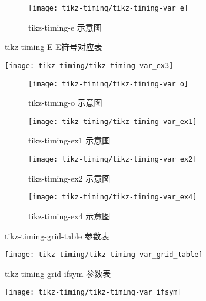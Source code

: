 \begin{figure}[]
  \centering
  \texttt{[image: tikz-timing/tikz-timing-var\_e]}\\
  \caption{tikz-timing-e 示意图}\label{tikz-timing-var_anchor}
\end{figure}
\begin{table}[H]
  \centering
  \caption{tikz-timing-E E符号对应表}\label{tikz-timing-var_ex3}
  \texttt{[image: tikz-timing/tikz-timing-var\_ex3]}\\
\end{table}
\begin{figure}[H]
  \centering
  \texttt{[image: tikz-timing/tikz-timing-var\_o]}\\
  \caption{tikz-timing-o 示意图}\label{tikz-timing-var_o}
\end{figure}

\begin{figure}[H]
  \centering
  \texttt{[image: tikz-timing/tikz-timing-var\_ex1]}\\
  \caption{tikz-timing-ex1 示意图}\label{tikz-timing-var_ex1}
\end{figure}
\begin{figure}[H]
  \centering
  \texttt{[image: tikz-timing/tikz-timing-var\_ex2]}\\
  \caption{tikz-timing-ex2 示意图}\label{tikz-timing-var_ex2}
\end{figure}
\begin{figure}[H]
  \centering
  \texttt{[image: tikz-timing/tikz-timing-var\_ex4]}\\
  \caption{tikz-timing-ex4 示意图}\label{tikz-timing-var_ex4}
\end{figure}

\begin{table}[H]
  \centering
    \caption{tikz-timing-grid-table 参数表}\label{tikz-timing-var_grid_table}
  \texttt{[image: tikz-timing/tikz-timing-var\_grid\_table]}\\
\end{table}

\begin{table}[H]
  \centering
    \caption{tikz-timing-grid-ifsym 参数表}\label{tikz-timing-var_grid_ifsym}
  \texttt{[image: tikz-timing/tikz-timing-var\_ifsym]}\\
\end{table}

